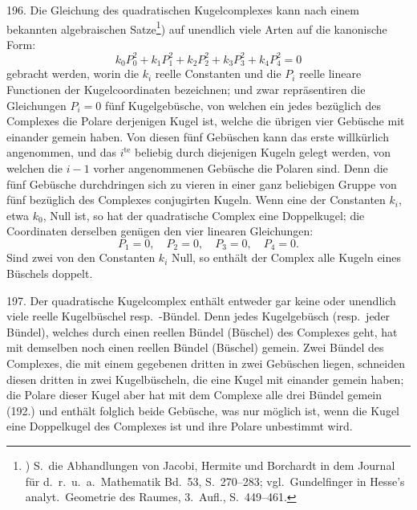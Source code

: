 196. Die Gleichung des quadratischen Kugelcomplexes
kann nach einem bekannten algebraischen Satze\footnote{) %
  S.\ die Abhandlungen von Jacobi, Hermite und Borchardt in dem
  Journal f\"ur d.\ r.\ u.\ a.\ Mathematik Bd.~53, S.~270--283; vgl.\
  Gundelfinger in Hesse's analyt.\ Geometrie des Raumes, 3.~Aufl.,
  S.~449--461.})
auf unendlich
viele Arten auf die kanonische Form:
\[
k_0 P_0^2 + k_1 P_1^2 + k_2 P_2^2 + k_3 P_3^2 + k_4 P_4^2 = 0
\]
gebracht werden, worin die $k_i$ reelle Constanten und die $P_i$
reelle lineare Functionen der Kugelcoordinaten bezeichnen;
und zwar repr\"asentiren die Gleichungen $P_i = 0$ f\"unf Kugelgeb\"usche,
von welchen ein jedes bez\"uglich des Complexes
die Polare derjenigen Kugel ist, welche die \"ubrigen vier
Geb\"usche mit einander gemein haben. Von diesen f\"unf Geb\"uschen
kann das erste willk\"urlich angenommen, und das $i^{\text{te}}$
beliebig durch diejenigen Kugeln gelegt werden, von welchen
die $i-1$ vorher angenommenen Geb\"usche die Polaren sind.
Denn die f\"unf Geb\"usche durchdringen sich zu vieren in einer
ganz beliebigen Gruppe von f\"unf bez\"uglich des Complexes
conjugirten Kugeln. Wenn eine der Constanten $k_i$, etwa $k_0$,
Null ist, so hat der quadratische Complex eine Doppelkugel;
die Coordinaten derselben gen\"ugen den vier linearen
Gleichungen:
\[
P_1=0,\quad P_2 = 0,\quad P_3 = 0,\quad P_4 = 0.
\]
Sind zwei von den Constanten $k_i$ Null, so enth\"alt der Complex
alle Kugeln eines B\"uschels doppelt.

197. Der quadratische Kugelcomplex enth\"alt entweder
gar keine oder unendlich viele reelle Kugelb\"uschel resp.\
-B\"undel. Denn jedes Kugelgeb\"usch (resp.\ jeder B\"undel),
welches durch einen reellen B\"undel (B\"uschel) des Complexes
geht, hat mit demselben noch einen reellen B\"undel (B\"uschel)
gemein. Zwei B\"undel des Complexes, die mit einem gegebenen
dritten in zwei Geb\"uschen liegen, schneiden diesen
dritten in zwei Kugelb\"uscheln, die eine Kugel mit einander
gemein haben; die Polare dieser Kugel aber hat mit dem
Complexe alle drei B\"undel gemein (192.) und enth\"alt folglich
beide Geb\"usche, was nur m\"oglich ist, wenn die Kugel
eine Doppelkugel des Complexes ist und ihre Polare unbestimmt
wird.

